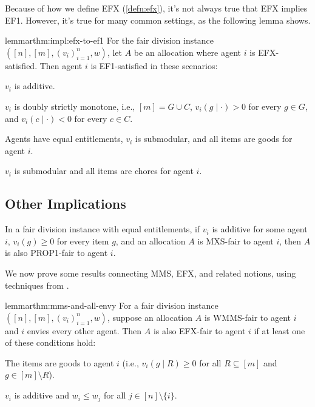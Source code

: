 Because of how we define EFX (\cref{defn:efx}),
it's not always true that EFX implies EF1.
However, it's true for many common settings, as the following lemma shows.

\begin{restatable}{lemma}{rthm:impl:efx-to-ef1}
\label{thm:impl:efx-to-ef1}
For the fair division instance $([n], [m], (v_i)_{i=1}^n, w)$,
let $A$ be an allocation where agent $i$ is EFX-satisfied.
Then agent $i$ is EF1-satisfied in these scenarios:
\begin{tightenum}
\item $v_i$ is additive.
\item $v_i$ is doubly strictly monotone, i.e., $[m] = G \cup C$, $v_i(g \mid \cdot) > 0$
    for every $g \in G$, and $v_i(c \mid \cdot) < 0$ for every $c \in C$.
\item Agents have equal entitlements, $v_i$ is submodular, and all items are goods for agent $i$.
\item $v_i$ is submodular and all items are chores for agent $i$.
\end{tightenum}
\end{restatable}

\subsection{Other Implications}

\begin{lemma}
\label{thm:impl:mxs-to-prop1}
In a fair division instance with equal entitlements,
if $v_i$ is additive for some agent $i$, $v_i(g) \ge 0$ for every item $g$,
and an allocation $A$ is MXS-fair to agent $i$, then $A$ is also PROP1-fair to agent $i$.
\end{lemma}

We now prove some results connecting MMS, EFX, and related notions,
using techniques from \cite{plaut2020almost,caragiannis2023new}.

\begin{restatable}{lemma}{rthm:mms-and-all-envy}
\label{thm:mms-and-all-envy}
For a fair division instance $([n], [m], (v_i)_{i=1}^n, w)$,
suppose an allocation $A$ is WMMS-fair to agent $i$
and $i$ envies every other agent.
Then $A$ is also EFX-fair to agent $i$ if at least one of these conditions hold:
\begin{tightenum}
\item The items are goods to agent $i$ (i.e., $v_i(g \mid R) \ge 0$
    for all $R \subseteq [m]$ and $g \in [m] \setminus R$).
\item $v_i$ is additive and $w_i \le w_j$ for all $j \in [n] \setminus \{i\}$.
\end{tightenum}
\end{restatable}

